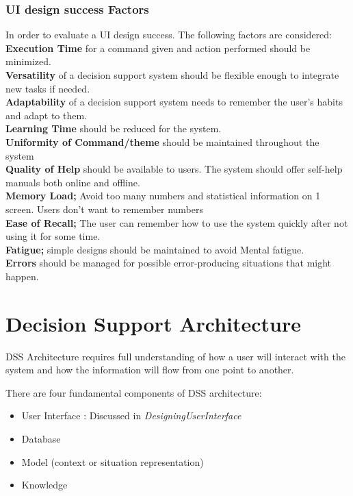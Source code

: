 \subsubsection{UI design success Factors}
In order to evaluate a UI design success. The following factors are considered:\\
\textbf{Execution Time} for a command given and action performed should be minimized.\\
\textbf{Versatility} of a decision support system should be flexible enough to integrate new tasks if needed.\\
\textbf{Adaptability} of a decision support system needs to remember the user's habits and adapt to them.\\
\textbf{Learning Time} should be reduced for the system.\\
\textbf{Uniformity of Command/theme} should be maintained throughout the system\\
\textbf{Quality of Help} should be available to users. The system should offer self-help manuals both online and offline.\\
\textbf{Memory Load;} Avoid too many numbers and statistical information on 1 screen. Users don't want to remember numbers\\
\textbf{Ease of Recall;} The user can remember how to use the system quickly after not using it for some time.\\
\textbf{Fatigue;} simple designs should be maintained to avoid Mental fatigue.\\
\textbf{Errors} should be managed for possible error-producing situations that might happen.
\section{Decision Support Architecture}
\label{sec:DecisionSupportArchitecture}
DSS Architecture requires full understanding of how a user will interact with the system and how the information will flow from one point to another.\cite{DSS} 

There are four fundamental components of DSS architecture:
\begin{itemize}
	\item User Interface : Discussed in \textit{DesigningUserInterface}
	\item Database
	\item Model (context or situation representation)
	\item Knowledge
\end{itemize}

